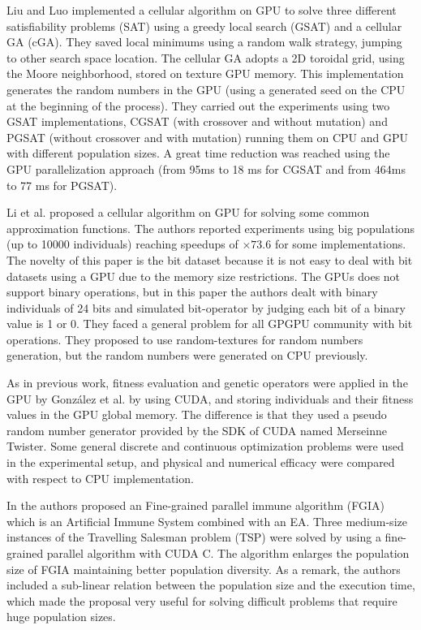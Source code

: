 \documentclass{article}
\begin{document}
Liu and Luo \cite{zhongwen-luo-cellular-2006} implemented a cellular algorithm on GPU to solve three different satisfiability problems (SAT)
using a greedy local search (GSAT) \cite{Selman93domain-independentextensions} and a cellular GA (cGA).
They saved local minimums using a random walk strategy, jumping to other search space location.
The cellular GA adopts a 2D toroidal grid, using the Moore neighborhood, stored on texture GPU memory. This implementation generates the random numbers in the GPU (using a generated seed on the CPU at the beginning of the process). They carried out the experiments using two GSAT implementations, CGSAT (with crossover and without mutation) and PGSAT (without crossover and with mutation) running them on CPU and GPU with different population sizes. A great time reduction was reached using the GPU parallelization approach (from 95ms to 18 ms for CGSAT and from 464ms to 77 ms for PGSAT).

Li et al. \cite{jian_ming_li_efficient_2007} proposed a cellular algorithm on GPU for solving some common approximation functions. The authors reported experiments using big populations (up to 10000 individuals) reaching speedups of $\times73.6$ for some implementations. The novelty of this paper is the bit dataset because it is not easy to deal with bit datasets using a GPU due to the memory size restrictions. The GPUs does not support binary operations, but in this paper the authors dealt with binary individuals of 24 bits  and simulated bit-operator by judging each bit of a binary value is 1 or 0. They faced a general problem for all GPGPU community with bit operations. They proposed to use random-textures for random numbers generation, but the random numbers were generated on CPU previously.

As in previous work, fitness evaluation and genetic operators were applied in the GPU by Gonz\'alez et al. \cite{springerlink:10.1007978-3-642-12538-619} by using CUDA, and storing individuals and their fitness values in the GPU global memory.
The difference is that they used a pseudo random number generator provided by the SDK of CUDA named Merseinne Twister. Some general discrete and continuous optimization problems were used in the experimental setup, and physical and numerical efficacy were compared with respect to CPU implementation.

In \cite{Li:2009:PIA:1726585.1726930} the authors proposed an Fine-grained parallel immune algorithm (FGIA) which is an Artificial Immune System combined with an EA. Three medium-size instances of the Travelling Salesman problem (TSP) were solved by using a fine-grained parallel algorithm with CUDA C. The algorithm enlarges the population size of FGIA maintaining better population diversity. As a remark, the authors included a sub-linear relation between the population size and the execution time, which made the proposal very useful for solving difficult problems that require huge population sizes.
\end{document}
